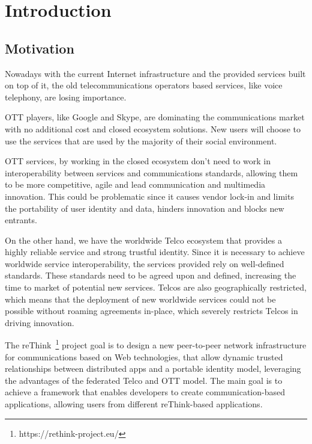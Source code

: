 \chapter{Introduction}
\label{chapter:introduction}

\section{Motivation}
\label{section:motivation}

Nowadays with the current Internet infrastructure and the provided services built on top of it, the old telecommunications operators based services, like voice telephony, are losing importance.

\ac{OTT} players, like Google and Skype, are dominating the communications market with no additional cost and closed ecosystem solutions.
New users will choose to use the services that are used by the majority of their social environment.

\ac{OTT} services, by working in the closed ecosystem don't need to work in interoperability between services and communications standards, allowing them to be more competitive, agile and lead communication and multimedia innovation.
This could be problematic since it causes vendor lock-in and limits the portability of user identity and data, hinders innovation and blocks new entrants.

On the other hand, we have the worldwide Telco ecosystem that provides a highly reliable service and strong trustful identity.
Since it is necessary to achieve worldwide service interoperability, the services provided rely on well-defined standards. These standards need to be agreed upon and defined, increasing the time to market of potential new services.
Telcos are also geographically restricted, which means that the deployment of new worldwide services could not be possible without roaming agreements in-place, which severely restricts Telcos in driving innovation.

The reThink~\footnote{https://rethink-project.eu/} project goal is to design a new peer-to-peer network infrastructure for communications based on Web technologies, that allow dynamic trusted relationships between distributed apps and a portable identity model, leveraging the advantages of the federated Telco and \ac{OTT} model.
The main goal is to achieve a framework that enables developers to create communication-based applications, allowing users from different reThink-based applications.

